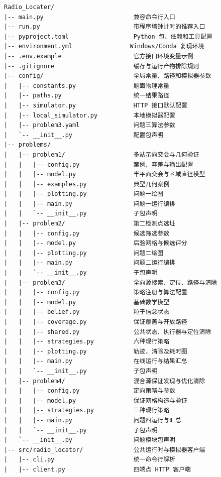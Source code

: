 \begin{Verbatim}[fontsize=\small,frame=single,breaklines=true,breakanywhere=true]
Radio_Locater/
|-- main.py                         兼容命令行入口
|-- run.py                          带程序墙钟计时的推荐入口
|-- pyproject.toml                  Python 包、依赖和工具配置
|-- environment.yml                Windows/Conda 复现环境
|-- .env.example                    官方接口环境变量示例
|-- .gitignore                      缓存与运行产物排除规则
|-- config/                         全局常量、路径和模拟器参数
|   |-- constants.py                题面物理常量
|   |-- paths.py                    统一结果路径
|   |-- simulator.py                HTTP 接口默认配置
|   |-- local_simulator.py          本地模拟器配置
|   |-- problem3.yaml               问题三算法参数
|   `-- __init__.py                 配置包声明
|-- problems/
|   |-- problem1/                   多站示向交会与几何验证
|   |   |-- config.py               案例、容差与输出配置
|   |   |-- model.py                半平面交会与区域直径模型
|   |   |-- examples.py             典型几何案例
|   |   |-- plotting.py             问题一绘图
|   |   |-- main.py                 问题一运行编排
|   |   `-- __init__.py             子包声明
|   |-- problem2/                   第二检测点选址
|   |   |-- config.py               候选筛选参数
|   |   |-- model.py                后验网格与候选评分
|   |   |-- plotting.py             问题二绘图
|   |   |-- main.py                 问题二运行编排
|   |   `-- __init__.py             子包声明
|   |-- problem3/                   全向源搜索、定位、路径与清除
|   |   |-- config.py               策略注册与算法配置
|   |   |-- model.py                基础数学模型
|   |   |-- belief.py               粒子信念状态
|   |   |-- coverage.py             保证覆盖与开放路径
|   |   |-- shared.py               公共状态、执行器与定位清除
|   |   |-- strategies.py           六种现行策略
|   |   |-- plotting.py             轨迹、清除及耗时图
|   |   |-- main.py                 在线运行与结果汇总
|   |   `-- __init__.py             子包声明
|   |-- problem4/                   混合源保证发现与优化清除
|   |   |-- config.py               定向策略与参数
|   |   |-- model.py                保证网格构造与验证
|   |   |-- strategies.py           三种现行策略
|   |   |-- main.py                 问题四运行与汇总
|   |   `-- __init__.py             子包声明
|   `-- __init__.py                 问题模块包声明
|-- src/radio_locator/              公共运行时与模拟器客户端
|   |-- cli.py                      统一命令行解析
|   |-- client.py                   四端点 HTTP 客户端

\end{Verbatim}
